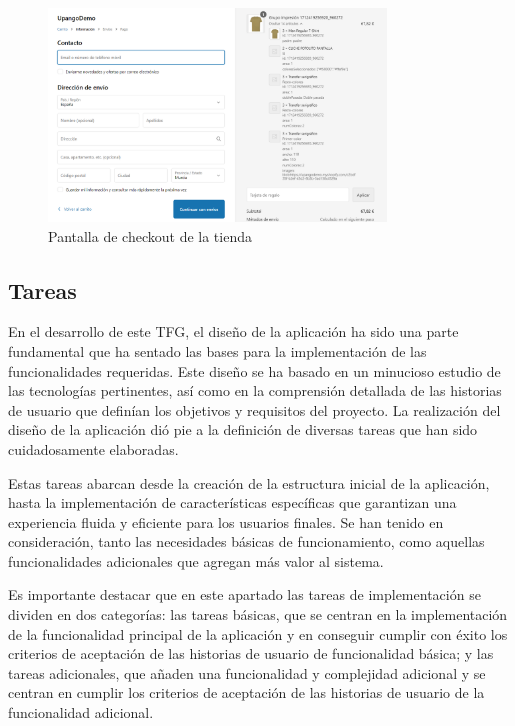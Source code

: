 \documentclass[11pt]{article}
\begin{document}
\begin{figure}[H]
    \centering
    \includegraphics[width=0.8\textwidth]{imagenes/ManualUsuario/ImagenCheckout.png}
    \caption{\label{fig:Checkout}Pantalla de checkout de la tienda}
    \vspace{\fill}
\end{figure}

\clearpage
\subsection{Tareas}\label{sec:tareas}

En el desarrollo de este TFG, el diseño de la aplicación ha sido una parte fundamental que ha sentado las bases para la implementación
de las funcionalidades requeridas. Este diseño se ha basado en un minucioso estudio de las tecnologías pertinentes, así como en la comprensión detallada de las
historias de usuario que definían los objetivos y requisitos del proyecto. La realización del diseño de la aplicación dió pie a la definición de diversas tareas que han sido cuidadosamente 
elaboradas.

Estas tareas abarcan desde la creación de la estructura inicial de la aplicación, hasta la implementación de características específicas que 
garantizan una experiencia fluida y eficiente para los usuarios finales. Se han tenido en consideración, tanto las necesidades básicas de funcionamiento, como aquellas funcionalidades
adicionales que agregan más valor al sistema.

Es importante destacar que en este apartado las tareas de implementación se dividen en dos categorías: las tareas básicas, que se centran en la implementación de la funcionalidad
principal de la aplicación y en conseguir cumplir con éxito los criterios de aceptación de las historias de usuario de funcionalidad básica; y las tareas adicionales, que 
añaden una funcionalidad y complejidad adicional y se centran en cumplir los criterios de aceptación de las historias de usuario de la funcionalidad adicional.
\end{document}
